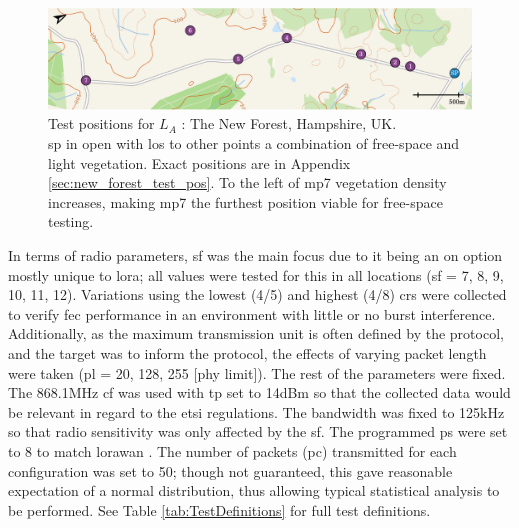   \begin{figure}[H]
    \centering
    \includegraphics[width=\textwidth]{Figures/new_forest_light.pdf}
    \caption[Test Location: The New Forest, Hampshire, UK]{
    Test positions for \textbf{$L_A$} :  The New Forest, Hampshire, UK.\protect\footnotemark[1] \\
    \ac{sp} in open with \ac{los} to other points a combination of free-space and light vegetation. Exact positions are in Appendix \ref{sec:new_forest_test_pos}. To the left of \ac{mp}7 vegetation density increases,  making \ac{mp}7 the furthest position viable for free-space testing.
    }
    \label{fig:new_forest_map}
\end{figure}

 In terms of radio parameters, \ac{sf} was the main focus due to it being an on option mostly unique to \ac{lora}; all values were tested for this in all locations (\ac{sf} = 7, 8, 9, 10, 11, 12). Variations using the lowest (4/5) and highest (4/8) \ac{cr}s were collected to verify \ac{fec} performance in an environment with little or no burst interference. Additionally, as the maximum transmission unit is often defined by the protocol, and the target was to inform the protocol, the effects of varying packet length were taken (\ac{pl} = 20, 128, 255 [\ac{phy} limit]). The rest of the parameters were fixed. The 868.1MHz \ac{cf} was used with \ac{tp} set to 14dBm so that the collected data would be relevant in regard to the \ac{etsi} regulations. The bandwidth was fixed to 125kHz so that radio sensitivity was only affected by the \ac{sf}. The programmed \ac{ps} were set to 8 to match \ac{lorawan} \cite{3YP:LORAWAN_REGIONAL_PARAMS}. The number of packets (\ac{pc}) transmitted for each configuration was set to 50; though not guaranteed, this gave reasonable expectation of a normal distribution, thus allowing typical statistical analysis to be performed. See Table \ref{tab:TestDefinitions} for full test definitions.
 
